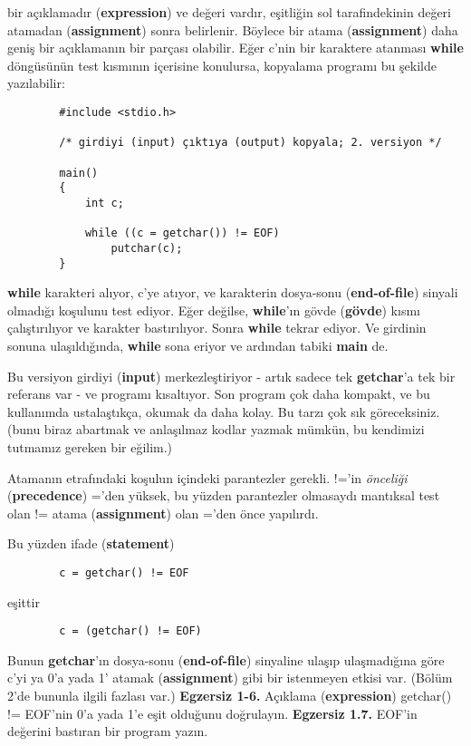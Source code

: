 \documentclass[a4paper,12pt,oneside]{book}
\begin{document}
bir açıklamadır (\textbf{expression}) ve değeri vardır, eşitliğin sol tarafindekinin değeri atamadan (\textbf{assignment}) sonra belirlenir. Böylece bir atama (\textbf{assignment}) daha geniş bir açıklamanın bir parçası olabilir. Eğer c'nin bir karaktere atanması \textbf{while} döngüsünün test kısmının içerisine konulursa, kopyalama programı bu şekilde yazılabilir:
\begin{lstlisting}
		#include <stdio.h>

		/* girdiyi (input) çıktıya (output) kopyala; 2. versiyon */

		main()
		{
			int c;

			while ((c = getchar()) != EOF)
				putchar(c);
		}
\end{lstlisting}

\textbf{while} karakteri alıyor, c'ye atıyor, ve karakterin dosya-sonu (\textbf{end-of-file}) sinyali olmadığı koşulunu test ediyor. Eğer değilse, \textbf{while}'ın gövde (\textbf{gövde}) kısmı çalıştırılıyor ve karakter bastırılıyor. Sonra \textbf{while} tekrar ediyor. Ve girdinin sonuna ulaşıldığında, \textbf{while} sona eriyor ve ardından tabiki \textbf{main} de.

\par Bu versiyon girdiyi (\textbf{input}) merkezleştiriyor - artık sadece tek \textbf{getchar}'a tek bir referans var - ve programı kısaltıyor. Son program çok daha kompakt, ve bu kullanımda ustalaştıkça, okumak da daha kolay. Bu tarzı çok sık göreceksiniz. (bunu biraz abartmak ve anlaşılmaz kodlar yazmak mümkün, bu kendimizi tutmamız gereken bir eğilim.)

\par Atamanın etrafındaki koşulun içindeki parantezler gerekli.  !='in \textit{önceliği} (\textbf{precedence})  ='den yüksek, bu yüzden parantezler olmasaydı mantıksal test olan  != atama (\textbf{assignment}) olan  ='den önce yapılırdı. \\ \pagebreak

Bu yüzden ifade (\textbf{statement})

\begin{lstlisting}
		c = getchar() != EOF
\end{lstlisting}
eşittir
\begin{lstlisting}
		c = (getchar() != EOF)
\end{lstlisting}
Bunun \textbf{getchar}'ın dosya-sonu (\textbf{end-of-file}) sinyaline ulaşıp ulaşmadığına göre c'yi ya 0'a yada 1' atamak (\textbf{assignment}) gibi bir istenmeyen etkisi var. (Bölüm 2'de bununla ilgili fazlası var.) \newline
\noindent \textbf{Egzersiz 1-6.} Açıklama (\textbf{expression}) getchar() != EOF'nin 0'a yada 1'e eşit olduğunu doğrulayın.
\newline
\noindent \textbf{Egzersiz 1.7.} EOF'in değerini bastıran bir program yazın.
\end{document}
